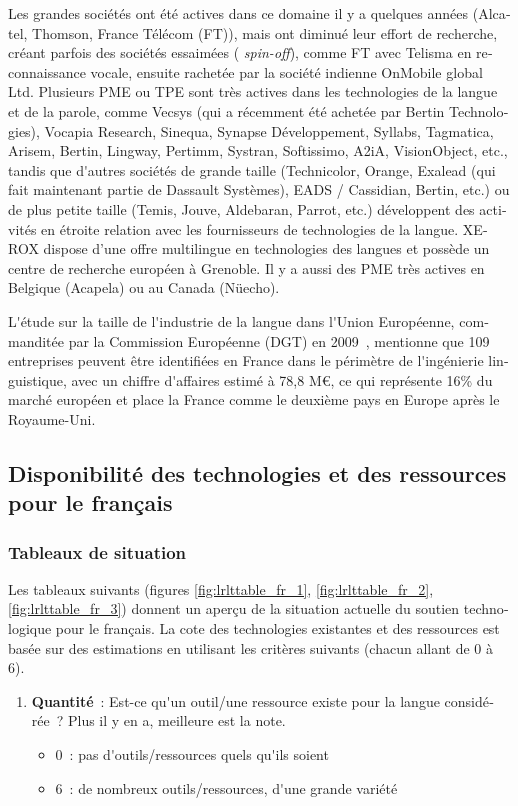 \begin{french}
\begin{multicols}{2}
Les grandes sociétés ont été actives dans ce domaine il y a quelques
années (Alcatel, Thomson, France Télécom (FT)), mais ont diminué leur
effort de recherche, créant parfois des sociétés essaimées ({\em
  spin-off}), comme FT avec Telisma en reconnaissance vocale, ensuite
rachetée par la société indienne OnMobile global Ltd. Plusieurs PME ou
TPE sont très actives dans les technologies de la langue et de la
parole, comme Vecsys (qui a récemment été achetée par Bertin
Technologies), Vocapia Research, Sinequa, Synapse Développement,
Syllabs, Tagmatica, Arisem, Bertin, Lingway, Pertimm, Systran,
Softissimo, A2iA, VisionObject, etc., tandis que d{\mbox '}autres
sociétés de grande taille (Technicolor, Orange, Exalead (qui fait
maintenant partie de Dassault Systèmes), EADS / Cassidian, Bertin,
etc.) ou de plus petite taille (Temis, Jouve, Aldebaran, Parrot, etc.)
développent des activités en étroite relation avec les fournisseurs de
technologies de la langue. XEROX dispose d'une offre multilingue en
technologies des langues et possède un centre de recherche européen à
Grenoble. Il y a aussi des PME très actives en Belgique (Acapela) ou
au Canada (Nüecho).

L{\mbox '}étude sur la taille de l{\mbox '}industrie de la langue dans l{\mbox '}Union
Européenne, commanditée par la Commission Européenne (DGT) en
2009~\cite{DGT09}, mentionne que 109 entreprises peuvent être
identifiées en France dans le périmètre de l{\mbox '}ingénierie linguistique,
avec un chiffre d{\mbox '}affaires estimé à 78,8 M€, ce qui représente 16\% du
marché européen et place la France comme le deuxième pays en
Europe après le Royaume-Uni.

\subsection{Disponibilité des technologies et des ressources pour le français}

\subsubsection{Tableaux de situation}
Les tableaux suivants (figures \ref{fig:lrlttable_fr_1},
\ref{fig:lrlttable_fr_2}, \ref{fig:lrlttable_fr_3}) donnent un aperçu
de la situation actuelle du soutien technologique pour le français. La
cote des technologies existantes et des ressources est basée sur des
estimations en utilisant les critères suivants (chacun allant de 0 à
6).

\begin{enumerate}
\item {\bf Quantité}~: Est-ce qu{\mbox '}un outil/une ressource existe pour la langue considérée~? Plus il y en a, meilleure est la note.
      \begin{itemize}
      \item 0~: pas d{\mbox '}outils/ressources quels qu{\mbox '}ils soient  
      \item 6~: de nombreux outils/ressources, d{\mbox '}une grande variété 
      \end{itemize}


\end{enumerate}
\end{multicols}
\end{french}
